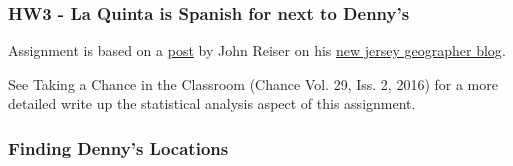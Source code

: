 \documentclass[12pt]{beamer}
\begin{document}
\begin{frame}[t]
\frametitle{HW3 - La Quinta is Spanish for next to Denny's}


\vspace{5mm}

Assignment is based on a \href{http://njgeo.org/2014/01/30/mitch-hedberg-and-gis/}{post} by John Reiser on his \href{http://njgeo.org/}{new jersey geographer blog}.

\vspace{5mm}

See Taking a Chance in the Classroom (Chance Vol. 29, Iss. 2, 2016) for a more detailed write up the statistical analysis aspect of this assignment.

\end{frame}


\begin{frame}[t]
\frametitle{Finding Denny's Locations}


\end{frame}


\end{document}
